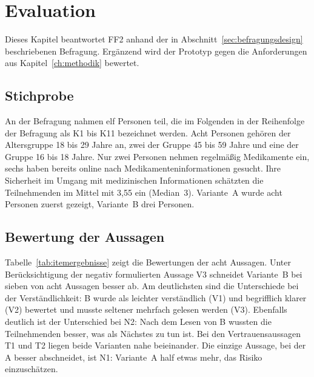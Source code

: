 \chapter{Evaluation}
\label{ch:evaluation}

Dieses Kapitel beantwortet FF2 anhand der in Abschnitt~\ref{sec:befragungsdesign} beschriebenen Befragung. Ergänzend wird der Prototyp gegen die Anforderungen aus Kapitel~\ref{ch:methodik} bewertet.

\section{Stichprobe}

An der Befragung nahmen elf Personen teil, die im Folgenden in der Reihenfolge der Befragung als K1 bis K11 bezeichnet werden. Acht Personen gehören der Altersgruppe 18 bis 29 Jahre an, zwei der Gruppe 45 bis 59 Jahre und eine der Gruppe 16 bis 18 Jahre. Nur zwei Personen nehmen regelmäßig Medikamente ein, sechs haben bereits online nach Medikamenteninformationen gesucht. Ihre Sicherheit im Umgang mit medizinischen Informationen schätzten die Teilnehmenden im Mittel mit 3{,}55 ein (Median~3). Variante~A wurde acht Personen zuerst gezeigt, Variante~B drei Personen.

\section{Bewertung der Aussagen}

Tabelle~\ref{tab:itemergebnisse} zeigt die Bewertungen der acht Aussagen. Unter Berücksichtigung der negativ formulierten Aussage V3 schneidet Variante~B bei sieben von acht Aussagen besser ab. Am deutlichsten sind die Unterschiede bei der Verständlichkeit: B wurde als leichter verständlich (V1) und begrifflich klarer (V2) bewertet und musste seltener mehrfach gelesen werden (V3). Ebenfalls deutlich ist der Unterschied bei N2: Nach dem Lesen von B wussten die Teilnehmenden besser, was als Nächstes zu tun ist. Bei den Vertrauensaussagen T1 und T2 liegen beide Varianten nahe beieinander. Die einzige Aussage, bei der A besser abschneidet, ist N1: Variante~A half etwas mehr, das Risiko einzuschätzen.

